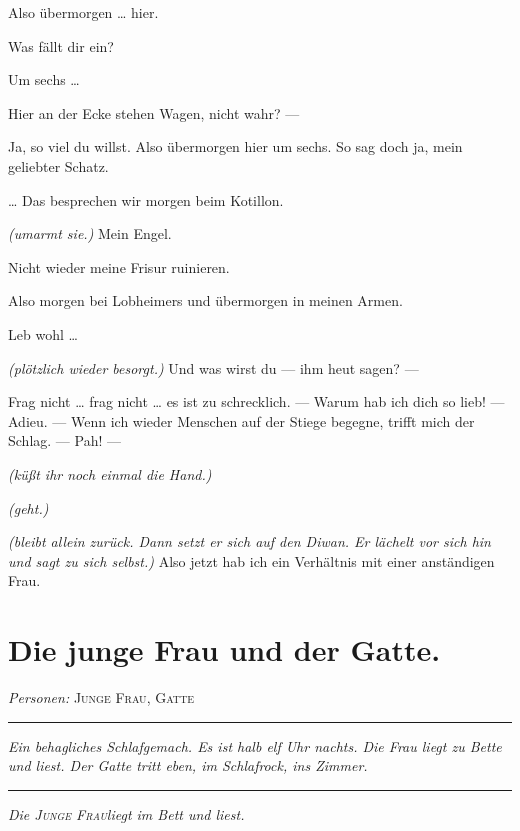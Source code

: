 \documentclass[
	final,
	a4paper,
	ngerman,
	mpinclude = true, %
	twoside = true,
	open = right,
	cleardoublepage = plain,
	DIV = 13,
	BCOR = 1cm,
	titlepage = firstiscover,
	]{scrbook}
\newcommand{\scene}{\section}
\newcommand{\direction}[1]{\textit{(#1)}}
\newcommand{\setting}[1]{\vspace{-0.5\baselineskip}\centering\textit{#1}}
\newenvironment{deletion}{%
		\vspace{0.25\baselineskip}
		\hrule
		\vspace{0.25\baselineskip}
		\color{darkgray}
	}{
		\color{black}
		\vspace{0.25\baselineskip}
		\hrule 
		\vspace{0.25\baselineskip}
	}
\newcommand{\characterlist}[1]{{\begin{center}\textit{Personen:} #1\end{center}}}
\newcommand{\thecharacter}[1]{\textup{\textsc{#1}}}
\newcommand{\theherr}{\thecharacter{Junger Herr}}
\newcommand{\thefrau}{\thecharacter{Junge Frau}}
\newcommand{\thegatte}{\thecharacter{Gatte}}
\newcommand{\character}[1]{\item[#1:]}
\newcommand{\herr}{\character{\theherr}}
\newcommand{\frau}{\character{\thefrau}}
\begin{document}
\begin{play}
	\herr
	Also übermorgen \ldots{} hier.

	\frau
	Was fällt dir ein?

	\herr
	Um sechs \ldots{}

	\frau
	Hier an der Ecke stehen Wagen, nicht wahr? ---

	\herr
	Ja, so viel du willst. Also übermorgen hier um sechs. So sag doch ja, mein geliebter Schatz.

	\frau
	\ldots{} Das besprechen wir morgen beim Kotillon.

	\herr
	\direction{umarmt sie.} Mein Engel.

	\frau
	Nicht wieder meine Frisur ruinieren.

	\herr
	Also morgen bei Lobheimers und übermorgen in meinen Armen.

	\frau
	Leb wohl \ldots{}

	\herr
	\direction{plötzlich wieder besorgt.} Und was wirst du --- ihm heut sagen? ---

	\frau
	Frag nicht \ldots{} frag nicht \ldots{} es ist zu schrecklich. --- Warum hab ich dich so lieb! --- Adieu. --- Wenn ich wieder Menschen auf der Stiege begegne, trifft mich der Schlag. --- Pah! ---

	\herr
	\direction{küßt ihr noch einmal die Hand.}

	\frau
	\direction{geht.}

	\herr
	\direction{bleibt allein zurück. Dann setzt er sich auf den Diwan. Er lächelt vor sich hin und sagt zu sich selbst.} Also jetzt hab ich ein Verhältnis mit einer anständigen Frau.

\end{play}

\scene{Die junge Frau und der Gatte.}
\characterlist{\thefrau, \thegatte}
\begin{deletion}
\setting{Ein behagliches Schlafgemach. Es ist halb elf Uhr nachts. Die Frau liegt zu Bette und liest. Der Gatte tritt eben, im Schlafrock, ins Zimmer.}
\end{deletion}
\setting{Die \thefrau liegt im Bett und liest.}
\end{document}
